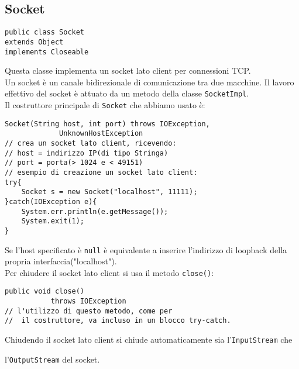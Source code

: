 \documentclass[a4paper, titlepage]{article}
\begin{document}
	\subsection{Socket}
		\begin{lstlisting}
public class Socket
extends Object
implements Closeable
		\end{lstlisting}		
		Questa classe implementa un socket lato client per connessioni TCP. \\
		Un socket è un canale bidirezionale di comunicazione tra due macchine.
		Il lavoro effettivo del socket è attuato da un metodo della classe \lstinline!SocketImpl!.\\
		Il costruttore principale di \lstinline!Socket! che abbiamo usato è:
		\begin{lstlisting}[]
Socket(String host, int port) throws IOException,
             UnknownHostException
// crea un socket lato client, ricevendo:
// host = indirizzo IP(di tipo Stringa)
// port = porta(> 1024 e < 49151)
// esempio di creazione un socket lato client:
try{
	Socket s = new Socket("localhost", 11111);
}catch(IOException e){
	System.err.println(e.getMessage());
	System.exit(1);
}
		\end{lstlisting}
		Se l'host specificato è \lstinline!null! è equivalente a inserire l'indirizzo di loopback
		della propria interfaccia("localhost").\\
		Per chiudere il socket lato client si usa il metodo \lstinline!close()!:
		\begin{lstlisting}
public void close()
           throws IOException
// l'utilizzo di questo metodo, come per
//  il costruttore, va incluso in un blocco try-catch.
		\end{lstlisting}
		Chiudendo il socket lato client si chiude automaticamente sia 
		l'\lstinline!InputStream! che 
		
		l'\lstinline!OutputStream! del socket.	
		\newpage	
\end{document}
